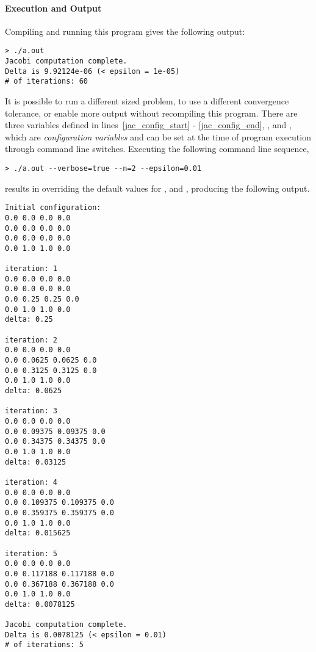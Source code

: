 \paragraph{Execution and Output}
Compiling and running this program gives the following output:
{\small
\begin{verbatim}
> ./a.out
Jacobi computation complete.
Delta is 9.92124e-06 (< epsilon = 1e-05)
# of iterations: 60
\end{verbatim}}

It is possible to run a different sized problem, to use a different
convergence tolerance, or enable more output without recompiling this
program.  There are three variables defined in lines~\ref{jac_config_start} - 
\ref{jac_config_end}, 
,  and , which are {\em configuration variables}
and can be set at the time of program execution through command line switches.
Executing the following command line sequence,
{\small
\begin{verbatim}
> ./a.out --verbose=true --n=2 --epsilon=0.01
\end{verbatim}}
results in overriding the default values for ,  and
, producing the following output.
{\small
\begin{verbatim}
Initial configuration:
0.0 0.0 0.0 0.0
0.0 0.0 0.0 0.0
0.0 0.0 0.0 0.0
0.0 1.0 1.0 0.0

iteration: 1
0.0 0.0 0.0 0.0
0.0 0.0 0.0 0.0
0.0 0.25 0.25 0.0
0.0 1.0 1.0 0.0
delta: 0.25

iteration: 2
0.0 0.0 0.0 0.0
0.0 0.0625 0.0625 0.0
0.0 0.3125 0.3125 0.0
0.0 1.0 1.0 0.0
delta: 0.0625

iteration: 3
0.0 0.0 0.0 0.0
0.0 0.09375 0.09375 0.0
0.0 0.34375 0.34375 0.0
0.0 1.0 1.0 0.0
delta: 0.03125

iteration: 4
0.0 0.0 0.0 0.0
0.0 0.109375 0.109375 0.0
0.0 0.359375 0.359375 0.0
0.0 1.0 1.0 0.0
delta: 0.015625

iteration: 5
0.0 0.0 0.0 0.0
0.0 0.117188 0.117188 0.0
0.0 0.367188 0.367188 0.0
0.0 1.0 1.0 0.0
delta: 0.0078125

Jacobi computation complete.
Delta is 0.0078125 (< epsilon = 0.01)
# of iterations: 5
\end{verbatim}}

